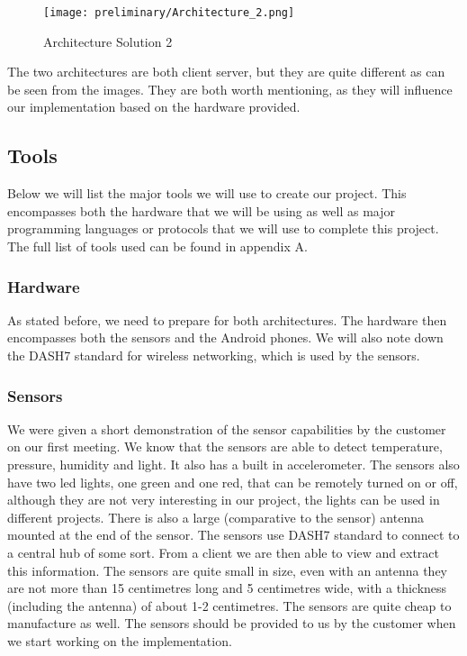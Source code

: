 \documentclass[../document]{subfiles}
\begin{document}
\begin{figure}[H]
	\texttt{[image: preliminary/Architecture\_2.png]}
	\caption{Architecture Solution 2}
	\label{fig:Architecture_2}
\end{figure}

The two architectures are both client server, but they are quite different as can be seen from the images. They are both worth mentioning, as they will influence our implementation based on the hardware provided.

\subsection{Tools}
Below we will list the major tools we will use to create our project. This encompasses both the hardware that we will be using as well as major programming languages or protocols that we will use to complete this project. The full list of tools used can be found in appendix A.

\subsubsection{Hardware}
As stated before, we need to prepare for both architectures. The hardware then encompasses both the sensors and the \gls{Android} phones. We will also note down the \gls{DASH7} standard for wireless networking, which is used by the sensors.

\subsubsection{Sensors}
We were given a short demonstration of the sensor capabilities by the customer on our first meeting. We know that the sensors are able to detect temperature, pressure, humidity and light. It also has a built in accelerometer. The sensors also have two led lights, one green and one red, that can be remotely turned on or off, although they are not very interesting in our project, the lights can be used in different projects. There is also a large (comparative to the sensor) antenna mounted at the end of the sensor. The sensors use \gls{DASH7} standard to connect to a central hub of some sort. From a client we are then able to view and extract this information. The sensors are quite small in size, even with an antenna they are not more than 15 centimetres long and 5 centimetres wide, with a thickness (including the antenna) of about 1-2 centimetres. The sensors are quite cheap to manufacture as well. The sensors should be provided to us by the customer when we start working on the implementation.
\end{document}
